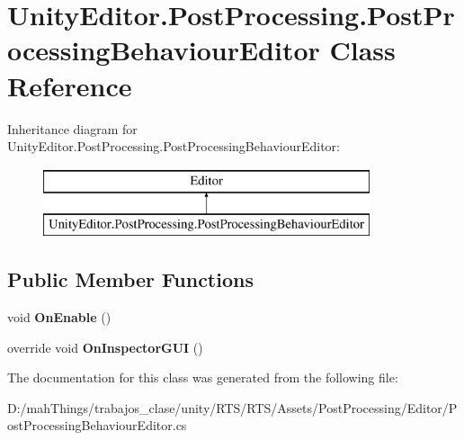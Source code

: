 \hypertarget{class_unity_editor_1_1_post_processing_1_1_post_processing_behaviour_editor}{}\section{Unity\+Editor.\+Post\+Processing.\+Post\+Processing\+Behaviour\+Editor Class Reference}
\label{class_unity_editor_1_1_post_processing_1_1_post_processing_behaviour_editor}
Inheritance diagram for Unity\+Editor.\+Post\+Processing.\+Post\+Processing\+Behaviour\+Editor\+:\begin{figure}[H]
\begin{center}
\leavevmode
\includegraphics[height=2.000000cm]{class_unity_editor_1_1_post_processing_1_1_post_processing_behaviour_editor}
\end{center}
\end{figure}
\subsection*{Public Member Functions}
\begin{DoxyCompactItemize}
\item 
\mbox{\label{class_unity_editor_1_1_post_processing_1_1_post_processing_behaviour_editor_a8934c4d3ca6fe5a4023285ac1a4f3358}} 
void {\bfseries On\+Enable} ()
\item 
\mbox{\label{class_unity_editor_1_1_post_processing_1_1_post_processing_behaviour_editor_a5a78f117e6e64b8abe14976c202ec7f4}} 
override void {\bfseries On\+Inspector\+G\+UI} ()
\end{DoxyCompactItemize}


The documentation for this class was generated from the following file\+:\begin{DoxyCompactItemize}
\item 
D\+:/mah\+Things/trabajos\+\_\+clase/unity/\+R\+T\+S/\+R\+T\+S/\+Assets/\+Post\+Processing/\+Editor/Post\+Processing\+Behaviour\+Editor.\+cs\end{DoxyCompactItemize}

